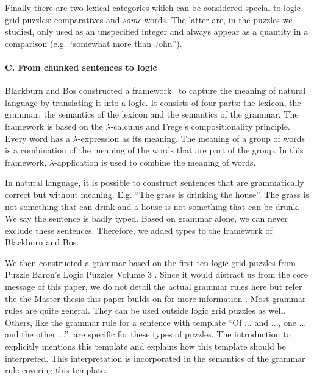 {%


Finally there are two lexical categories which can be considered special to logic grid puzzles: comparatives and \textit{some}-words. The latter are, in the puzzles we studied, only used as an unspecified integer and always appear as a quantity in a comparison (e.g. ``somewhat more than John'').
}

\paragraph{C. From chunked sentences to logic}

Blackburn and Bos constructed a framework~\cite{Blackburn2005,Blackburn2006} to capture the meaning of natural language by translating it into a logic. It consists of four parts: the lexicon, the grammar, the semantics of the lexicon and the semantics of the grammar. The framework is based on the $\lambda$-calculus and Frege's compositionality principle. Every word has a $\lambda$-expression as its meaning. The meaning of a group of words is a combination of the meaning of the words that are part of the group. In this framework, $\lambda$-application is used to combine the meaning of words.

In natural language, it is possible to construct sentences that are grammatically correct but without meaning. E.g. ``The grass is drinking the house''. The grass is not something that can drink and a house is not something that can be drunk. We say the sentence is badly typed. Based on grammar alone, we can never exclude these sentences. Therefore, we added types to the framework of Blackburn and Bos.

We then constructed a grammar based on the first ten logic grid puzzles from Puzzle Baron's Logic Puzzles Volume 3 \cite{logigrammen}.
Since it would distract us from the core message of this paper, we do not detail the actual grammar rules here but refer the the Master thesis this paper builds on \cite{msc/Claes17} for more information . 
Most grammar rules are quite general. They can be used outside logic grid puzzles as well. Others, like the grammar rule for a sentence with template ``Of ... and ..., one ... and the other ...'', are specific for these types of puzzles. The introduction to \cite{logigrammen} explicitly mentions this template and explains how this template should be interpreted. This interpretation is incorporated in the semantics of the grammar rule covering this template.

